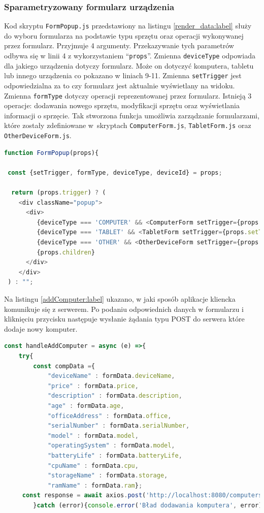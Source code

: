 \subsubsection{Sparametryzowany formularz urządzenia}
Kod skryptu \texttt{FormPopup.js} przedstawiony na listingu \ref{render_data:label} służy do wyboru formularza na podstawie typu sprzętu oraz operacji wykonywanej przez formularz. Przyjmuje 4 argumenty. Przekazywanie tych parametrów odbywa się w linii 4 z wykorzystaniem "`\texttt{props}"'. Zmienna \texttt{deviceType} odpowiada dla jakiego urządzenia dotyczy formularz. Może on dotyczyć komputera, tabletu lub innego urządzenia co pokazano w liniach 9-11. Zmienna \texttt{setTrigger} jest odpowiedzialna za to czy formularz jest aktualnie wyświetlany na widoku. Zmienna \texttt{formType} dotyczy operacji reprezentowanej przez formularz. Istnieją 3 operacje: dodawania nowego sprzętu, modyfikacji sprzętu oraz wyświetlania informacji o sprzęcie. Tak stworzona funkcja umożliwia zarządzanie formularzami, które zostały zdefiniowane w~skryptach \texttt{ComputerForm.js}, \texttt{TabletForm.js} oraz \texttt{OtherDeviceForm.js}.
\begin{lstlisting}[language=JavaScript, style=JavaScriptStyle,  caption={Obsługa formularzy}, label={render_data:label}]
function FormPopup(props){
    
 const {setTrigger, formType, deviceType, deviceId} = props;
    
  return (props.trigger) ? (
    <div className="popup">
      <div>
         {deviceType === 'COMPUTER' && <ComputerForm setTrigger={props.setTrigger} formType={formType} deviceId={deviceId}/>}
         {deviceType === 'TABLET' && <TabletForm setTrigger={props.setTrigger} formType={formType} deviceId={deviceId}/>}
         {deviceType === 'OTHER' && <OtherDeviceForm setTrigger={props.setTrigger}  formType={formType} deviceId={deviceId} />}
         {props.children}
      </div>
    </div>
 ) : "";
\end{lstlisting}


Na listingu \ref{addComputer:label} ukazano, w jaki sposób aplikacje kliencka komunikuje się z serwerem. Po podaniu odpowiednich danych w formularzu i kliknięciu przycisku następuje wysłanie żądania typu POST do serwera które dodaje nowy komputer. 
\begin{lstlisting}[language=JavaScript, style=JavaScriptStyle,  caption={Przykładowe zapytanie do serwera dla formularza komputera}, label={addComputer:label}]
const handleAddComputer = async (e) =>{
    try{
        const compData ={
            "deviceName" : formData.deviceName,
            "price" : formData.price,
            "description" : formData.description,
            "age" : formData.age,
            "officeAddress" : formData.office,
            "serialNumber" : formData.serialNumber,
            "model" : formData.model,
            "operatingSystem" : formData.model,
            "batteryLife" : formData.batteryLife,
            "cpuName" : formData.cpu,
            "storageName" : formData.storage,
            "ramName" : formData.ram};
     const response = await axios.post('http://localhost:8080/computers/add', compData, {});
        }catch (error){console.error('Bład dodawania komputera', error)}}
\end{lstlisting}

